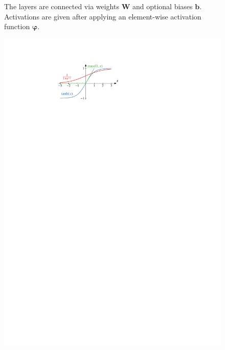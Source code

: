\begin{figure}[htb]
\begin{minipage}[t]{0.55\textwidth}
{      The layers are connected via weights $\mathbf{W}$ and optional biases
      $\mathbf{b}$. Activations are given after applying an element-wise
      activation function $\bm{\varphi}$.}
    \label{fig:multi_layer_perceptron}
  \end{minipage}\hfill
  \begin{minipage}[t]{0.4\textwidth}
    \centering
    \includegraphics{./figures/theory/activation_functions.pdf}
    \label{fig:activation_functions}
  \end{minipage}
\end{figure}




